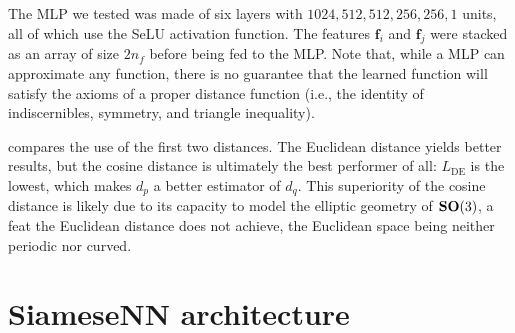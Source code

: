 The MLP we tested was made of six layers with $1024, 512, 512, 256, 256, 1$ units, all of which use the SeLU activation function. The features $\mathbf{f}_i$ and $\mathbf{f}_j$ were stacked as an array of size $2n_f$ before being fed to the MLP\@. Note that, while a MLP can approximate any function, there is no guarantee that the learned function will satisfy the axioms of a proper distance function (i.e., the identity of indiscernibles, symmetry, and triangle inequality). 

 compares the use of the first two distances. The Euclidean distance yields better results, but the cosine distance is ultimately the best performer of all: $L_\text{DE}$ is the lowest, which makes $d_p$ a better estimator of $d_q$.
This superiority of the cosine distance is likely due to its capacity to model the elliptic geometry of $\mathrm{\mathbf{SO}}(3)$, a feat the Euclidean distance does not achieve, the Euclidean space being neither periodic nor curved.

\clearpage
\section{SiameseNN architecture}\label{apx:siamese-architecture}




